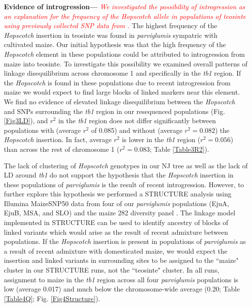 \documentclass[11pt]{article} %
\newcommand{\track}[1]{\textcolor{red}{\emph{\normalsize #1}} }
\begin{document}
\begin{linenumbers}
\begin{flushleft}
\textbf{Evidence of introgression---} \track{We investigated the possibility of introgression as an explanation for the frequency of the \emph{Hopscotch} allele in populations of teosinte using previously collected SNP data from \citep{Pyhajarvi2013}.} The highest frequency of the \emph{Hopscotch} insertion in teosinte was found in \emph{parviglumis} sympatric with cultivated maize. Our initial hypothesis was that the high frequency of the \emph{Hopscotch} element in these populations could be attributed to introgression from maize into teosinte. To investigate this possibility we examined overall patterns of linkage disequilibrium across chromosome 1 and specifically in the \emph{tb1} region. If the \emph{Hopscotch} is found in these populations due to recent introgression from maize we would expect to find large blocks of linked markers near this element. We find no evidence of elevated linkage disequilibrium between the \emph{Hopscotch} and SNPs surrounding the \emph{tb1} region in our resequenced populations (Fig.\ref{Fig3LD}), and $r^{2}$ in the \emph{tb1} region  does not differ significantly between populations with (average $r^{2}$ of 0.085) and without (average $r^{2}=0.082$) the \emph{Hopscotch} insertion. In fact, average $r^{2}$ is lower in the \emph{tb1} region ($r^{2}=0.056$) than across the rest of chromosome 1 ($r^{2}=0.083$; Table \ref{Table3R2}).

The lack of clustering of \emph{Hopscotch} genotypes in our NJ tree as well as the lack of LD around \emph{tb1} do not support the hypothesis that the \emph{Hopscotch} insertion in these populations of \emph{parviglumis} is the result of recent introgression. However, to further explore this hypothesis we performed a STRUCTURE analysis using Illumina MaizeSNP50 data from four of our \emph{parviglumis} populations (EjuA, EjuB, MSA, and SLO) \citep{Pyhajarvi2013} and the maize 282 diversity panel \citep{Cook2012}. 
The linkage model implemented in STRUCTURE can be used to identify ancestry of blocks of linked variants which would arise as the result of recent admixture between populations. If the \emph{Hopscotch} insertion is present in populations of \emph{parviglumis} as a result of recent admixture with domesticated maize, we would expect the insertion and linked variants in surrounding sites to be assigned to the ``maize" cluster in our STRUCTURE runs, not the ``teosinte" cluster. In all runs, assignment to maize in the \emph{tb1} region across all four \emph{parviglumis} populations is low (average 0.017) and much below the chromosome-wide average (0.20; Table \ref{Table4Q}; Fig. \ref{Fig4Structure}). 


\end{flushleft}
\end{linenumbers}
\end{document}

